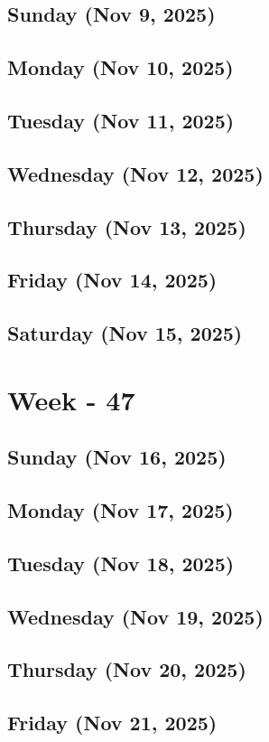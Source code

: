 \subsection*{Sunday (Nov 9, 2025)}
\subsection*{Monday (Nov 10, 2025)}
\subsection*{Tuesday (Nov 11, 2025)}
\subsection*{Wednesday (Nov 12, 2025)}
\subsection*{Thursday (Nov 13, 2025)}
\subsection*{Friday (Nov 14, 2025)}
\subsection*{Saturday (Nov 15, 2025)}

\section{Week - 47}
\subsection*{Sunday (Nov 16, 2025)}
\subsection*{Monday (Nov 17, 2025)}
\subsection*{Tuesday (Nov 18, 2025)}
\subsection*{Wednesday (Nov 19, 2025)}
\subsection*{Thursday (Nov 20, 2025)}
\subsection*{Friday (Nov 21, 2025)}
